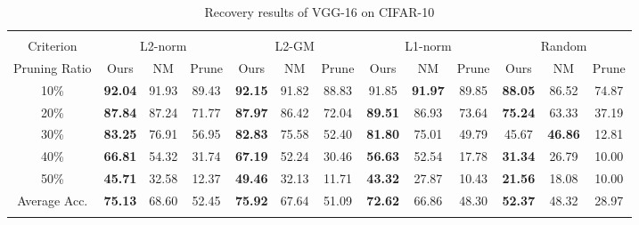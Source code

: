 \begin{table*}[t] %
\centering
{\normalsize 
\begin{tabular}{c||c|c|c||c|c|c||c|c|c||c|c|c}  \Xhline{2\arrayrulewidth}
\multicolumn{13}{c}{\textbf{VGG-16 (Acc. 93.7)}}
\\ \Xhline{2\arrayrulewidth} %
Criterion & \multicolumn{3}{c||}{L2-norm} & \multicolumn{3}{c||}{L2-GM} & \multicolumn{3}{c||}{L1-norm}& \multicolumn{3}{c}{Random}\\ \hline
Pruning Ratio& Ours& NM& Prune& Ours& NM& Prune& Ours& NM& Prune& Ours& NM& Prune\\ \Xhline{2\arrayrulewidth}
10\%& \textbf{92.04} & 91.93 & 89.43 & \textbf{92.15} & 91.82 & 88.83 & 91.85 & \textbf{91.97} & 89.85 & \textbf{88.05} & 86.52 & 74.87 \\\hline
20\%& \textbf{87.84} & 87.24 & 71.77 & \textbf{87.97} & 86.42 & 72.04 & \textbf{89.51} & 86.93 & 73.64 & \textbf{75.24} & 63.33 & 37.19 \\ \hline
30\%& \textbf{83.25} & 76.91 & 56.95 & \textbf{82.83} & 75.58 & 52.40 & \textbf{81.80} & 75.01 & 49.79 & 45.67 & \textbf{46.86} & 12.81 \\ \hline
40\%& \textbf{66.81} & 54.32 & 31.74 & \textbf{67.19} & 52.24 & 30.46 & \textbf{56.63} & 52.54 & 17.78 & \textbf{31.34} & 26.79 & 10.00 \\ \hline
50\%& \textbf{45.71} & 32.58 & 12.37 & \textbf{49.46} & 32.13 & 11.71 & \textbf{43.32} & 27.87 & 10.43 & \textbf{21.56} & 18.08 & 10.00 \\ \Xhline{2\arrayrulewidth}
Average Acc. & \textbf{75.13} & 68.60 & 52.45 & \textbf{75.92} & 67.64 & 51.09 & \textbf{72.62} & 66.86 & 48.30 & \textbf{52.37} & 48.32 & 28.97\\ \Xhline{2\arrayrulewidth}   
\end{tabular}
}
\vspace{2mm}
\caption{Recovery results of VGG-16 on CIFAR-10}
\label{tab:VGG16-CIFAR10}
\vspace{1.5mm}
{\normalsize

}
\end{table*}
